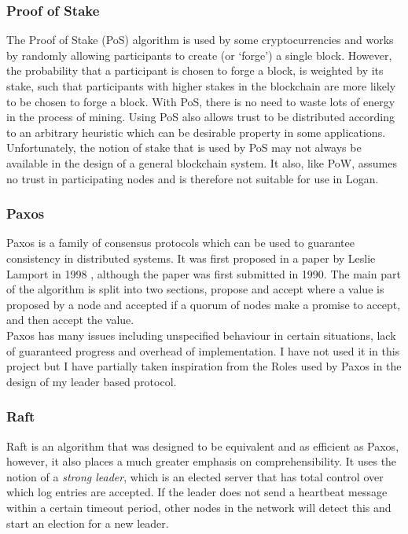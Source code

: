 \documentclass[12pt,a4paper,twoside,openright]{report}
\begin{document}
	\subsubsection*{Proof of Stake}
	The Proof of Stake (PoS) algorithm \cite{ProofofStake} is used by some cryptocurrencies and works by randomly allowing participants to create (or `forge') a single block.
	However, the probability that a participant is chosen to forge a block, is weighted by its stake, such that participants with higher stakes in the blockchain are more likely to be chosen to forge a block.
	With PoS, there is no need to waste lots of energy in the process of mining. 
	Using PoS also allows trust to be distributed according to an arbitrary heuristic which can be desirable property in some applications.\\

	Unfortunately, the notion of stake that is used by PoS may not always be available in the design of a general blockchain system. 
	It also, like PoW, assumes no trust in participating nodes and is therefore not suitable for use in Logan.

	\subsubsection*{Paxos}
	Paxos is a family of consensus protocols which can be used to guarantee consistency in distributed systems. 
	It was first proposed in a paper by Leslie Lamport in 1998 \cite{Paxos}, although the paper was first submitted in 1990.
	The main part of the algorithm is split into two sections, propose and accept where a value is proposed by a node and accepted if a quorum of nodes make a promise to accept, and then accept the value.\\

	Paxos has many issues including unspecified behaviour in certain situations, lack of guaranteed progress and overhead of implementation.
	I have not used it in this project but I have partially taken inspiration from the Roles used by Paxos in the design of my leader based protocol.

	\subsubsection*{Raft}
	Raft \cite{Raft} is an algorithm that was designed to be equivalent and as efficient as Paxos, however, it also places a much greater emphasis on comprehensibility.
	It uses the notion of a \textit{strong leader}, which is an elected server that has total control over which log entries are accepted.
	If the leader does not send a heartbeat message within a certain timeout period, other nodes in the network will detect this and start an election for a new leader.\\
	
\end{document}
